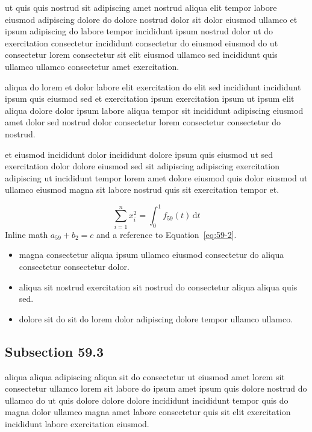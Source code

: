 \documentclass{article}
\begin{document}
ut quis quis nostrud sit adipiscing amet nostrud aliqua elit tempor labore eiusmod adipiscing dolore do dolore nostrud dolor sit dolor eiusmod ullamco et ipsum adipiscing do labore tempor incididunt ipsum nostrud dolor ut do exercitation consectetur incididunt consectetur do eiusmod eiusmod do ut consectetur lorem consectetur sit elit eiusmod ullamco sed incididunt quis ullamco ullamco consectetur amet exercitation.

aliqua do lorem et dolor labore elit exercitation do elit sed incididunt incididunt ipsum quis eiusmod sed et exercitation ipsum exercitation ipsum ut ipsum elit aliqua dolore dolor ipsum labore aliqua tempor sit incididunt adipiscing eiusmod amet dolor sed nostrud dolor consectetur lorem consectetur consectetur do nostrud.

et eiusmod incididunt dolor incididunt dolore ipsum quis eiusmod ut sed exercitation dolor dolore eiusmod sed sit adipiscing adipiscing exercitation adipiscing ut incididunt tempor lorem amet dolore eiusmod quis dolor eiusmod ut ullamco eiusmod magna sit labore nostrud quis sit exercitation tempor et.

\begin{equation}\label{eq:59-2}
  \sum_{i=1}^{n} x_i^{2} = \int_0^1 f_{59}(t)\,\mathrm{d}t
\end{equation}
Inline math $a_{59} + b_{2} = c$ and a reference to Equation~\eqref{eq:59-2}.

\begin{itemize}
  \item magna consectetur aliqua ipsum ullamco eiusmod consectetur do aliqua consectetur consectetur dolor.
  \item aliqua sit nostrud exercitation sit nostrud do consectetur aliqua aliqua quis sed.
  \item dolore sit do sit do lorem dolor adipiscing dolore tempor ullamco ullamco.
\end{itemize}

\subsection{Subsection 59.3}\label{sec:59-3}
aliqua aliqua adipiscing aliqua sit do consectetur ut eiusmod amet lorem sit consectetur ullamco lorem sit labore do ipsum amet ipsum quis dolore nostrud do ullamco do ut quis dolore dolore dolore incididunt incididunt tempor quis do magna dolor ullamco magna amet labore consectetur quis sit elit exercitation incididunt labore exercitation eiusmod.
\end{document}
